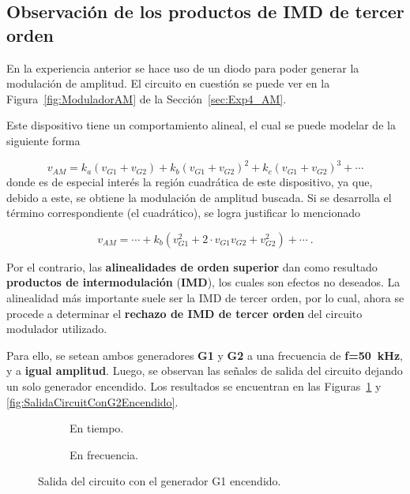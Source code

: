   \subsection{Observación de los productos de IMD de tercer orden}
    En la experiencia anterior se hace uso de un diodo para poder generar la modulación de
    amplitud. El circuito en cuestión se puede ver en la Figura~\ref{fig:ModuladorAM} de
    la Sección~\ref{sec:Exp4_AM}.

    Este dispositivo tiene un comportamiento alineal, el cual se puede modelar
    de la siguiente  forma

    \vspace{-10pt}
    \begin{equation*}
      v_{AM} = k_a(v_{G1}+v_{G2}) + k_b(v_{G1}+v_{G2})^2 + k_c(v_{G1}+v_{G2})^3 + \cdots
    \end{equation*}
    donde es de especial interés la región cuadrática de este dispositivo, ya que,
    debido a este, se obtiene la modulación de amplitud buscada. Si se 
    desarrolla el término correspondiente (el cuadrático), se logra justificar lo
    mencionado
    
    \vspace{-10pt}
    \begin{equation*}
      v_{AM} = \cdots + k_b(v_{G1}^2 + 2\cdot{v_{G1}v_{G2}} + v_{G2}^2) + \cdots ~.
    \end{equation*}

    Por el contrario, las \textbf{alinealidades de orden superior} dan como resultado \textbf{productos
    de intermodulación} (\textbf{IMD}), los cuales son efectos no deseados. La alinealidad más
    importante suele ser la IMD de tercer orden, por lo cual, ahora se procede a determinar el
    \textbf{rechazo de IMD de tercer orden} del circuito modulador utilizado.

    Para ello, se setean ambos generadores \textbf{G1} y \textbf{G2} a una frecuencia de 
    \textbf{f=50~kHz}, y a \textbf{igual amplitud}. Luego, se observan las señales de salida del circuito 
    dejando un solo generador encendido. Los resultados se encuentran en las Figuras~\ref{fig:SalidaCircuitConG1Encendido}
    y \ref{fig:SalidaCircuitConG2Encendido}.


    \begin{figure}[H]
      \centering
      \begin{subfigure}[H]{0.48\textwidth}
        \caption{En tiempo.}
      \end{subfigure}
      \hfill 
      \begin{subfigure}[H]{0.48\textwidth}
        \caption{En frecuencia.}
      \end{subfigure}

      \caption{Salida del circuito con el generador G1 encendido.}
      \label{fig:SalidaCircuitConG1Encendido}
    \end{figure}


